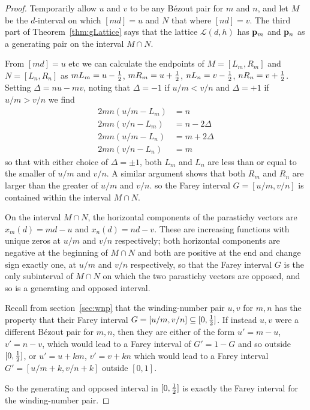 \begin{proof}
	Temporarily allow $u$ and $v$ to be any B\'ezout pair for $m$ and $n$, and let  $M$ be the $d$-interval on which $[md]=u$ 
		and  $N$ that where $[nd]=v$. The third part of Theorem~\ref{thm:gLattice} says that the lattice $\mathcal{L}({d,h})$ has  ${\mathbf p}_{m}$ and ${\mathbf p}_{n}$ as a generating pair on the interval $M\cap N $. 
				

	From $[md]=u$ etc we can calculate the endpoints of $M=[L_m,R_m]$ and $N=[L_n,R_n]$ as $m L_m=u-\textstyle{\frac{1}{2}}$, $mR_m=u+\textstyle{\frac{1}{2}}$, $n L_n=v-\textstyle{\frac{1}{2}}$, $n R_n=v+\textstyle{\frac{1}{2}}$. 	Setting $\Delta=n u - mv$, noting that $\Delta=-1$ if $u/m<v/n$ and $\Delta=+1$ if $u/m>v/n$  we find 
	\begin{align*}
		 2mn (u/m-L_m)& =n 
		 \\
		  2mn (v/n-L_m)& =n - 2\Delta
		 \\
		 	 2mn (u/m-L_n)& =m+2\Delta
				 \\
		 	 2mn (v/n-L_n)& =m
		\end{align*}
		so that with either choice of $\Delta=\pm 1$, both $L_m$ and $L_n$ are less than or equal to the smaller of $u/m$ and $v/n$.
		A similar argument shows that both $R_m$ and $R_n$ are larger than the greater of  $u/m$ and $v/n$.
		so the Farey interval $G=[u/m,v/n]$ is contained within the  interval $M\cap N $.
		
	On the interval  $M\cap N $, the horizontal components of the parastichy vectors are  $x_m(d)=md-u$ and $x_n(d)=nd-v$.  These are increasing functions with unique zeros at $u/m$ and $v/n$ respectively; both horizontal components are negative at the beginning of  $M\cap N$ and both are positive at the end and change sign exactly one, at  $u/m$ and $v/n$ respectively, so that the Farey interval $G$ is the only subinterval of $M\cap N$ on which the two parastichy vectors are opposed, and so is a generating and opposed interval.
				
	Recall from section~\ref{sec:wnp} that the winding-number pair $u, v$ for $m, n$ has the property that their Farey interval $G=[u/m,v/n]\subseteq[0,\textstyle{\frac{1}{2}}]$. If instead $u, v$ were a different B\'ezout pair for $m,n$, then they are either of the form $u'=m-u$, $v'=n-v$, which would lead to a Farey interval of $G'=1-G$ and so outside $[0,\textstyle{\frac{1}{2}}]$, or $u'=u+km$, $v'=v+kn$ which would lead to a Farey interval $G'=[u/m+k,v/n+k]$ outside $[0,1]$. 
	
	So the generating and opposed interval in  $[0,\textstyle{\frac{1}{2}}]$ is exactly the Farey interval for the winding-number pair. 
	
			
\end{proof}

